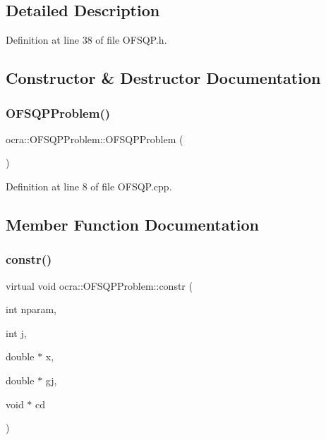 \subsection{Detailed Description}


Definition at line 38 of file O\+F\+S\+Q\+P.\+h.



\subsection{Constructor \& Destructor Documentation}
\hypertarget{classocra_1_1OFSQPProblem_affaeb6cbf6326ef2e9dab6b7ee8c80f6}{}\label{classocra_1_1OFSQPProblem_affaeb6cbf6326ef2e9dab6b7ee8c80f6} 
\subsubsection{\texorpdfstring{O\+F\+S\+Q\+P\+Problem()}{OFSQPProblem()}}
{\footnotesize\ttfamily ocra\+::\+O\+F\+S\+Q\+P\+Problem\+::\+O\+F\+S\+Q\+P\+Problem (\begin{DoxyParamCaption}{ }\end{DoxyParamCaption})}



Definition at line 8 of file O\+F\+S\+Q\+P.\+cpp.



\subsection{Member Function Documentation}
\hypertarget{classocra_1_1OFSQPProblem_a2049a97008ac6eaa306c3cb05ef7d394}{}\label{classocra_1_1OFSQPProblem_a2049a97008ac6eaa306c3cb05ef7d394} 
\subsubsection{\texorpdfstring{constr()}{constr()}}
{\footnotesize\ttfamily virtual void ocra\+::\+O\+F\+S\+Q\+P\+Problem\+::constr (\begin{DoxyParamCaption}\item[{int}]{nparam,  }\item[{int}]{j,  }\item[{double $\ast$}]{x,  }\item[{double $\ast$}]{gj,  }\item[{void $\ast$}]{cd }\end{DoxyParamCaption})\hspace{0.3cm}{\ttfamily [pure virtual]}}



